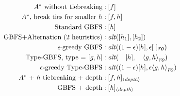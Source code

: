 \begin{table}[htbp]
 \centering
 \setlength{\tabcolsep}{0.2em}
 \begin{align*}
  \mbox{\astar without tiebreaking}         &: [f]   \\
  \mbox{\astar, break ties for smaller $h$} &: [f,h] \\
  \mbox{Standard GBFS}                      &: [h]   \\
  \mbox{GBFS+Alternation (2 heuristics)}    &: \mit{alt}([h_1],[h_2])   \\
  \mbox{$\epsilon$-greedy GBFS}             &: \mit{alt}((1-\epsilon)[h], \epsilon [\ ]_{\ro}) \\
  \mbox{Type-GBFS, type = $[g,h]$}          &: \mit{alt}(\quad       [h],\quad \brackets{g,h}_{\ro}) \\
  \mbox{$\epsilon$-greedy Type-GBFS}        &: \mit{alt}((1-\epsilon)[h], \epsilon\brackets{g,h}_{\ro}) \\
  \mbox{\astar + $h$ tiebreaking + depth}   &: [f,h]_{\brackets{\mit{\scriptsize depth}}} \\
  \mbox{GBFS + depth}                       &: [h]_{\brackets{\mit{\scriptsize depth}}} \\
 \end{align*}
 \caption{Various search algorithms using the notation in this paper}
\end{table}






